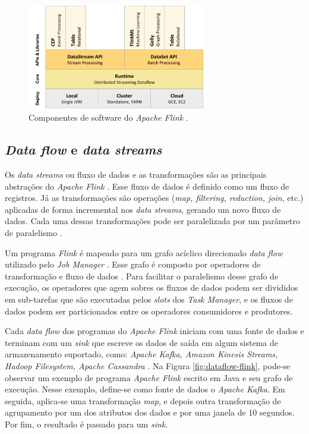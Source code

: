 \begin{figure}[ht]
\centering
\includegraphics[width=0.7\textwidth]{figuras/software-flink.png}
\caption{Componentes de software do \emph{Apache Flink} \cite{Carbone2015}.}
\label{fig:software-flink}
\end{figure}

\subsection{\emph{Data flow} e \emph{data streams}}

Os \emph{data streams} ou fluxo de dados e as transformações são as principais
abstrações do \emph{Apache Flink} \cite{Lopez2018,ApacheFlink2020}.
Esse fluxo de dados é definido como um fluxo de registros.
Já as transformações são operações (\emph{map, filtering, reduction, join},
etc.) aplicadas de forma incremental nos \emph{data streams}, gerando um novo
fluxo de dados.
Cada uma dessas transformações pode ser paralelizada por um parâmetro de
paralelismo \cite{Lopez2018}.

Um programa \emph{Flink} é mapeado para um grafo acíclico direcionado \emph{data
flow} utilizado pelo \emph{Job Manager} \cite{Carbone2015}.
Esse grafo é composto por operadores de transformação e fluxo de dados
\cite{ApacheFlink2020}.
Para facilitar o paralelismo desse grafo de execução, os operadores que agem
sobres os fluxos de dados podem ser divididos em sub-tarefas que são executadas
pelos \emph{slots} dos \emph{Task Manager}, e os fluxos de dados podem ser
particionados entre os operadores consumidores e produtores.

Cada \emph{data flow} dos programas do \emph{Apache Flink} iniciam com uma fonte
de dados e terminam com um \emph{sink} que escreve os dados de saída em algum
sistema de armazenamento suportado, como: \emph{Apache Kafka, Amazon Kinesis Streams,
Hadoop Filesystem, Apache Cassandra} \cite{ApacheFlink2020}.
Na Figura \ref{fig:dataflow-flink}, pode-se observar um exemplo de programa
\emph{Apache Flink} escrito em Java e seu grafo de execução.
Nesse exemplo, define-se como fonte de dados o \emph{Apache Kafka}.
Em seguida, aplica-se uma transformação \emph{map}, e depois outra transformação
de agrupamento por um dos atributos dos dados e por uma janela de 10 segundos.
Por fim, o resultado é passado para um \emph{sink}.


